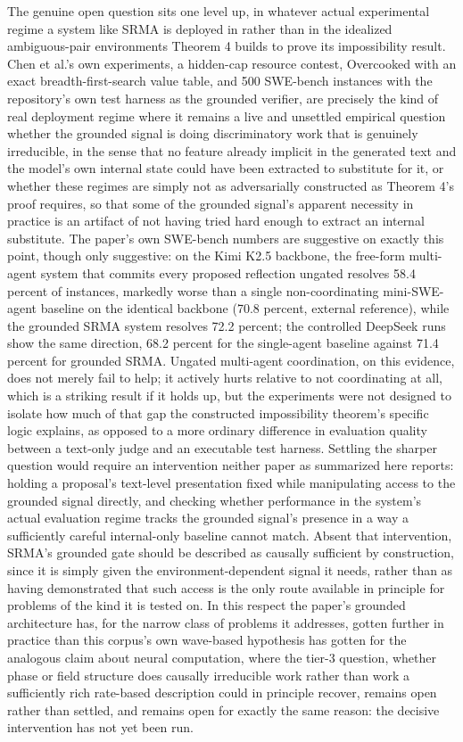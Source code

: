 \documentclass[11pt]{article}
\begin{document}
The genuine open question sits one level up, in whatever actual experimental regime a system like SRMA is deployed in rather than in the idealized ambiguous-pair environments Theorem 4 builds to prove its impossibility result. Chen et al.'s own experiments, a hidden-cap resource contest, Overcooked with an exact breadth-first-search value table, and 500 SWE-bench instances with the repository's own test harness as the grounded verifier, are precisely the kind of real deployment regime where it remains a live and unsettled empirical question whether the grounded signal is doing discriminatory work that is genuinely irreducible, in the sense that no feature already implicit in the generated text and the model's own internal state could have been extracted to substitute for it, or whether these regimes are simply not as adversarially constructed as Theorem 4's proof requires, so that some of the grounded signal's apparent necessity in practice is an artifact of not having tried hard enough to extract an internal substitute. The paper's own SWE-bench numbers are suggestive on exactly this point, though only suggestive: on the Kimi K2.5 backbone, the free-form multi-agent system that commits every proposed reflection ungated resolves 58.4 percent of instances, markedly worse than a single non-coordinating mini-SWE-agent baseline on the identical backbone (70.8 percent, external reference), while the grounded SRMA system resolves 72.2 percent; the controlled DeepSeek runs show the same direction, 68.2 percent for the single-agent baseline against 71.4 percent for grounded SRMA. Ungated multi-agent coordination, on this evidence, does not merely fail to help; it actively hurts relative to not coordinating at all, which is a striking result if it holds up, but the experiments were not designed to isolate how much of that gap the constructed impossibility theorem's specific logic explains, as opposed to a more ordinary difference in evaluation quality between a text-only judge and an executable test harness. Settling the sharper question would require an intervention neither paper as summarized here reports: holding a proposal's text-level presentation fixed while manipulating access to the grounded signal directly, and checking whether performance in the system's actual evaluation regime tracks the grounded signal's presence in a way a sufficiently careful internal-only baseline cannot match. Absent that intervention, SRMA's grounded gate should be described as causally sufficient by construction, since it is simply given the environment-dependent signal it needs, rather than as having demonstrated that such access is the only route available in principle for problems of the kind it is tested on. In this respect the paper's grounded architecture has, for the narrow class of problems it addresses, gotten further in practice than this corpus's own wave-based hypothesis has gotten for the analogous claim about neural computation, where the tier-3 question, whether phase or field structure does causally irreducible work rather than work a sufficiently rich rate-based description could in principle recover, remains open rather than settled, and remains open for exactly the same reason: the decisive intervention has not yet been run.
\end{document}
